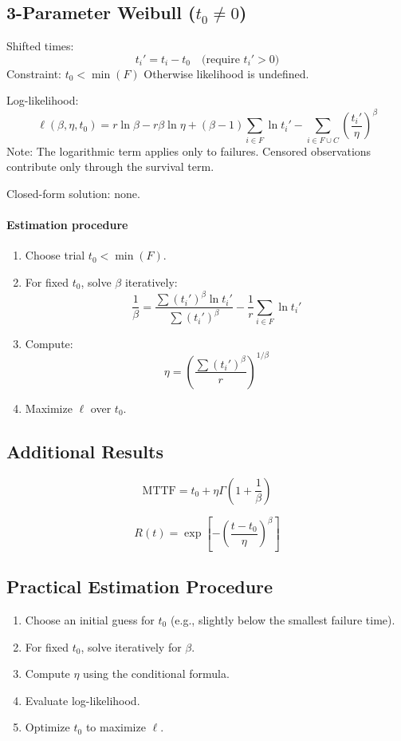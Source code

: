 \documentclass[10pt,a4paper,twocolumn]{article}
\begin{document}
\subsection*{3-Parameter Weibull ($t_0 \neq 0$)}

Shifted times:
\[
t_i' = t_i - t_0
\quad \text{(require } t_i' > 0 \text{)}
\]
Constraint: $t_0 < \min(F)$
Otherwise likelihood is undefined.

Log-likelihood:
\[
\ell(\beta,\eta,t_0)
=
r\ln\beta - r\beta\ln\eta
+(\beta-1)\sum_{i\in F}\ln t_i'
-\sum_{i\in F\cup C}
\left(\frac{t_i'}{\eta}\right)^\beta
\]
Note: The logarithmic term applies only to failures.
Censored observations contribute only through the survival term.

Closed-form solution: none.

\paragraph{Estimation procedure}

\begin{enumerate}
\item Choose trial $t_0 < \min(F)$.
\item For fixed $t_0$, solve $\beta$ iteratively:
\[
\frac{1}{\beta}
=
\frac{
\sum (t_i')^\beta \ln t_i'
}{
\sum (t_i')^\beta
}
-
\frac{1}{r}
\sum_{i\in F}\ln t_i'
\]
\item Compute:
\[
\eta
=
\left(
\frac{
\sum (t_i')^\beta
}{r}
\right)^{1/\beta}
\]
\item Maximize $\ell$ over $t_0$.
\end{enumerate}

\subsection*{Additional Results}

\[
\text{MTTF}=t_0 + \eta\Gamma\left(1+\frac{1}{\beta}\right)
\]

\[
R(t)=\exp\left[-\left(\frac{t-t_0}{\eta}\right)^\beta\right]
\]

\subsection*{Practical Estimation Procedure}

\begin{enumerate}
\item Choose an initial guess for $t_0$ 
      (e.g., slightly below the smallest failure time).
\item For fixed $t_0$, solve iteratively for $\beta$.
\item Compute $\eta$ using the conditional formula.
\item Evaluate log-likelihood.
\item Optimize $t_0$ to maximize $\ell$.
\end{enumerate}
\end{document}
